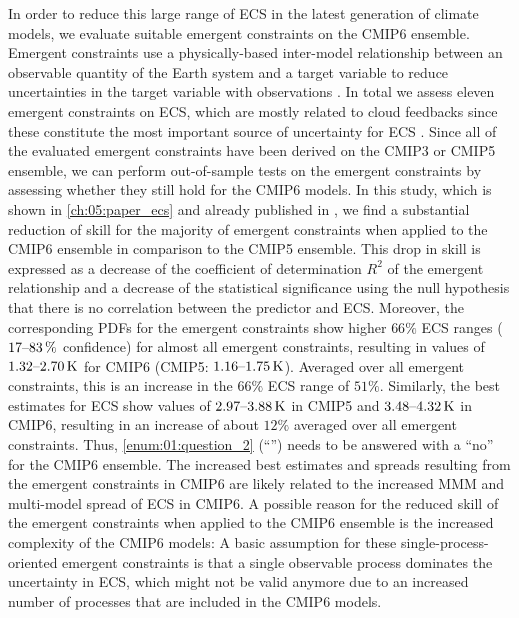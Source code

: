 In order to reduce this large range of \ac{ECS} in the latest generation of
climate  models, we evaluate suitable emergent constraints on the \acs{CMIP}6
ensemble. Emergent constraints use a physically-based inter-model relationship
between an observable quantity of the Earth system and a target variable to
reduce uncertainties in the target variable with observations
\autocite{Allen2002}. In total we assess eleven emergent constraints on
\ac{ECS}, which are mostly related to cloud feedbacks since these constitute
the most important source of uncertainty for \ac{ECS} \autocite{Boucher2013,
  Flato2013}. Since all of the evaluated emergent constraints have been derived
on the \acs{CMIP}3 or \acs{CMIP}5 ensemble, we can perform out-of-sample tests
on the emergent constraints by assessing whether they still hold for the
\acs{CMIP}6 models. In this study, which is shown in \cref{ch:05:paper_ecs} and
already published in \textcite{Schlund2020a}, we find a substantial reduction
of skill for the majority of emergent constraints when applied to the
\acs{CMIP}6 ensemble in comparison to the \acs{CMIP}5 ensemble. This drop in
skill is expressed as a decrease of the coefficient of determination $R^2$ of
the emergent relationship and a decrease of the statistical significance using
the null hypothesis that there is no correlation between the predictor and
\ac{ECS}. Moreover, the corresponding \acp{PDF} for the emergent constraints
show higher $66 \unit{\%}$ \ac{ECS} ranges ($\rangeunit{17}{83}{\%}$
confidence) for almost all emergent constraints, resulting in values of
$\rangeunit{1.32}{2.70}{K}$ for \acs{CMIP}6 (\acs{CMIP}5:
$\rangeunit{1.16}{1.75}{K}$). Averaged over all emergent constraints, this is
an increase in the $66 \unit{\%}$ \ac{ECS} range of $51 \unit{\%}$. Similarly,
the best estimates for \ac{ECS} show values of $\rangeunit{2.97}{3.88}{K}$ in
\acs{CMIP}5 and $\rangeunit{3.48}{4.32}{K}$ in \acs{CMIP}6, resulting in an
increase of about $12 \unit{\%}$ averaged over all emergent constraints. Thus,
\cref{enum:01:question_2} (\enquote{\emph{\KeyScienceQuestionTwo{}}}) needs to
be answered with a \enquote{no} for the \acs{CMIP}6 ensemble. The increased
best estimates and spreads resulting from the emergent constraints in
\acs{CMIP}6 are likely related to the increased \ac{MMM} and multi-model spread
of \ac{ECS} in \acs{CMIP}6. A possible reason for the reduced skill of the
emergent constraints when applied to the \acs{CMIP}6 ensemble is the increased
complexity of the \acs{CMIP}6 models: A basic assumption for these
single-process-oriented emergent constraints is that a single observable
process dominates the uncertainty in \ac{ECS}, which might not be valid anymore
due to an increased number of processes that are included in the \acs{CMIP}6
models.

